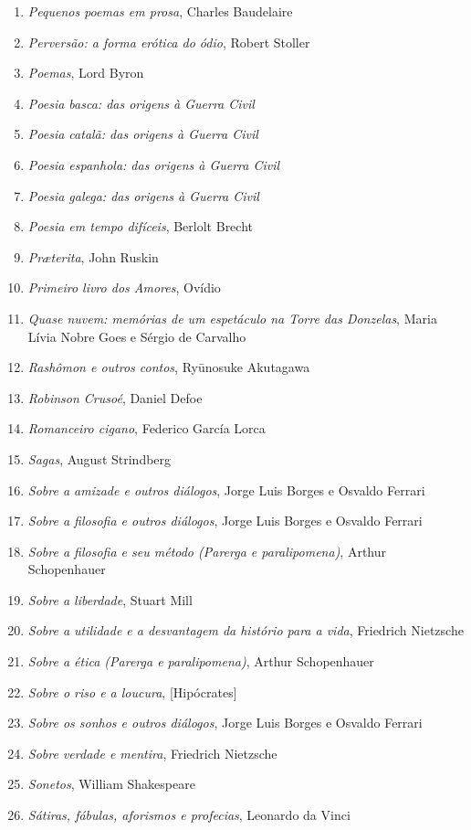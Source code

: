 \begin{enumerate}
\item \textit{Pequenos poemas em prosa}, Charles Baudelaire
\item \textit{Perversão: a forma erótica do ódio}, Robert Stoller
\item \textit{Poemas}, Lord Byron
\item \textit{Poesia basca: das origens à Guerra Civil} 
\item \textit{Poesia catalã: das origens à Guerra Civil} 
\item \textit{Poesia espanhola: das origens à Guerra Civil} 
\item \textit{Poesia galega: das origens à Guerra Civil} 
\item \textit{Poesia em tempo difíceis}, Berlolt Brecht 
\item \textit{Pr\ae terita}, John Ruskin
\item \textit{Primeiro livro dos Amores}, Ovídio
\item \textit{Quase nuvem: memórias de um espetáculo na Torre das Donzelas}, Maria Lívia Nobre Goes e Sérgio de Carvalho
\item \textit{Rashômon e outros contos}, Ryūnosuke Akutagawa
\item \textit{Robinson Crusoé}, Daniel Defoe
\item \textit{Romanceiro cigano}, Federico García Lorca
\item \textit{Sagas}, August Strindberg
\item \textit{Sobre a amizade e outros diálogos}, Jorge Luis Borges e Osvaldo Ferrari
\item \textit{Sobre a filosofia e outros diálogos}, Jorge Luis Borges e Osvaldo Ferrari
\item \textit{Sobre a filosofia e seu método (Parerga e paralipomena)}, Arthur Schopenhauer 
\item \textit{Sobre a liberdade}, Stuart Mill
\item \textit{Sobre a utilidade e a desvantagem da histório para a vida}, Friedrich Nietzsche
\item \textit{Sobre a ética (Parerga e paralipomena)}, Arthur Schopenhauer 
\item \textit{Sobre o riso e a loucura}, [Hipócrates]
\item \textit{Sobre os sonhos e outros diálogos}, Jorge Luis Borges e Osvaldo Ferrari
\item \textit{Sobre verdade e mentira}, Friedrich Nietzsche
\item \textit{Sonetos}, William Shakespeare
\item \textit{Sátiras, fábulas, aforismos e profecias}, Leonardo da Vinci

\end{enumerate}
